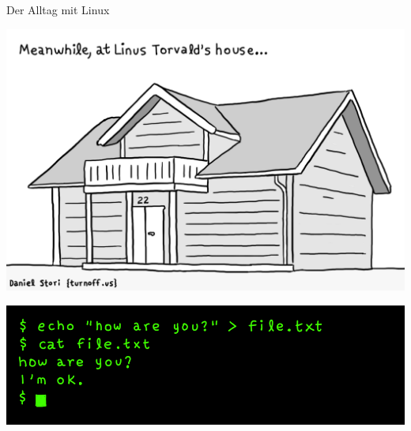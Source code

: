 \begin{frame}{Der Alltag mit Linux \smiley{}}
    \begin{center}
        \includegraphics[width=.7\textwidth]{img/linus-torvalds-house}
    \end{center}

    \smallskip

    \begin{center}
        \includegraphics[width=.7\textwidth]{img/ghost-in-the-shell}
    \end{center}
\end{frame}

